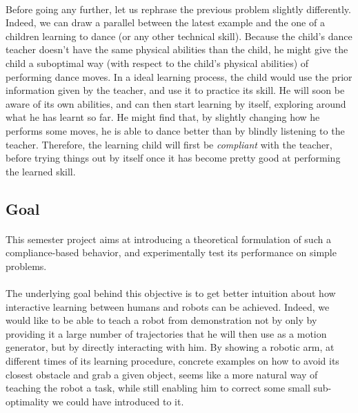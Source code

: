 \documentclass[a4paper]{report}
\begin{document}
{{			\paragraph{} Before going any further, let us rephrase the previous problem slightly differently.  Indeed, we can draw a parallel between the latest example and the one of a children learning to dance (or any other technical skill). Because the child's dance teacher doesn't have the same physical abilities than the child, he might give the child a suboptimal way (with respect to the child's physical abilities) of performing dance moves. In a ideal learning process, the child would use the prior information given by the teacher, and use it to practice its skill. He will soon be aware of its own abilities, and can then start learning by itself, exploring around what he has learnt so far. He might find that, by slightly changing how he performs some moves,  he is able to dance better than by blindly listening to the teacher. Therefore, the learning child will first be \emph{compliant} with the teacher, before trying things out by itself once it has become pretty good at performing the learned skill. 
			
			\subsection{Goal}
			\paragraph{} This semester project aims at introducing a theoretical formulation of such a compliance-based behavior, and experimentally test its performance on simple problems.
			
			\paragraph{} The underlying goal behind this objective is to get better intuition about how interactive learning between humans and robots can be achieved. Indeed, we would like to be able to teach a robot from demonstration not by only by providing it a large number of trajectories that he will then use as a motion generator, but by directly interacting with him. By showing a robotic arm, at different times of its learning procedure, concrete examples on how to avoid its closest obstacle and grab a given object, seems like a more natural way of teaching the robot a task, while still enabling him to correct some small sub-optimality we could have introduced to it. 
			
}}
\end{document}
